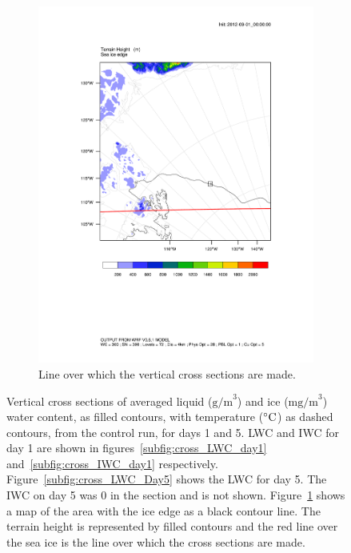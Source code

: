 \begin{figure}
\begin{subfigure}{0.48\textwidth}
        \includegraphics[width=\textwidth]{results/control/crossSec_line.pdf}
        \caption{Line over which the vertical cross sections are made.}
        \label{subfig:cross_line}
    \end{subfigure}
    \caption{Vertical cross sections of averaged liquid ($\text{g/m}^3$) and ice  ($\text{mg/m}^3$) water content, as filled contours, with temperature ($\degree\text{C}$) as dashed contours, from the control run, for days 1 and 5. LWC and IWC for day 1 are shown in figures~\ref{subfig:cross_LWC_day1} and~\ref{subfig:cross_IWC_day1} respectively. Figure~\ref{subfig:cross_LWC_Day5} shows the LWC for day 5. The IWC on day 5 was 0 in the section and is not shown. Figure~\ref{subfig:cross_line} shows a map of the area with the ice edge as a black contour line. The terrain height is represented by filled contours and the red line over the sea ice is the line over which the cross sections are made.}
    \label{fig:sections}
\end{figure}

